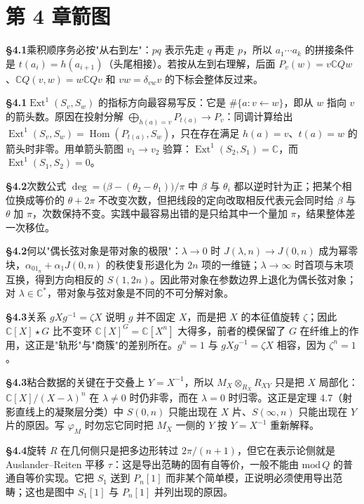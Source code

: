 \section*{第 4 章\quad 箭图}
\noindent\textbf{§4.1}\quad 乘积顺序务必按"从右到左"：$pq$ 表示先走 $q$ 再走 $p$，所以 $a_1\cdots a_k$ 的拼接条件是 $t(a_i)=h(a_{i+1})$（头尾相接）。若按从左到右理解，后面 $P_v(w)=v\mathbb C Qw$、$\mathbb C Q(v,w)=w\mathbb C Qv$ 和 $vw=\delta_{vw}v$ 的下标会整体反过来。\par\medskip
\noindent\textbf{§4.1}\quad $\operatorname{Ext}^1(S_v,S_w)$ 的指标方向最容易写反：它是 $\#\{a:v\leftarrow w\}$，即从 $w$ 指向 $v$ 的箭头数。原因在投射分解 $\bigoplus_{h(a)=v}P_{t(a)}\to P_v$：同调计算给出 $\operatorname{Ext}^1(S_v,S_w)=\operatorname{Hom}(P_{t(a)},S_w)$，只在存在满足 $h(a)=v$、$t(a)=w$ 的箭头时非零。用单箭头箭图 $v_1\to v_2$ 验算：$\operatorname{Ext}^1(S_2,S_1)=\mathbb C$，而 $\operatorname{Ext}^1(S_1,S_2)=0$。\par\medskip
\noindent\textbf{§4.2}\quad 次数公式 $\deg=\bigl(\beta-(\theta_2-\theta_1)\bigr)/\pi$ 中 $\beta$ 与 $\theta_i$ 都以逆时针为正；把某个相位换成等价的 $\theta+2\pi$ 不改变次数，但把线段的定向改取相反代表元会同时给 $\beta$ 与 $\theta$ 加 $\pi$，次数保持不变。实践中最容易出错的是只给其中一个量加 $\pi$，结果整体差一次移位。\par\medskip
\noindent\textbf{§4.2}\quad 何以"偶长弦对象是带对象的极限"：$\lambda\to0$ 时 $J(\lambda,n)\to J(0,n)$ 成为幂零块，$\alpha_01_n+\alpha_1J(0,n)$ 的秩使复形退化为 $2n$ 项的一维链；$\lambda\to\infty$ 时首项与末项互换，得到方向相反的 $S(1,2n)$。因此带对象在参数边界上退化为偶长弦对象；对 $\lambda\in\mathbb C^*$，带对象与弦对象是不同的不可分解对象。\par\medskip
\noindent\textbf{§4.3}\quad 关系 $gXg^{-1}=\zeta X$ 说明 $g$ 并不固定 $X$，而是把 $X$ 的本征值旋转 $\zeta$；因此 $\mathbb C[X]\star G$ 比不变环 $\mathbb C[X]^G=\mathbb C[X^n]$ 大得多，前者的模保留了 $G$ 在纤维上的作用，这正是"轨形"与"商簇"的差别所在。$g^n=1$ 与 $gXg^{-1}=\zeta X$ 相容，因为 $\zeta^n=1$。\par\medskip
\noindent\textbf{§4.3}\quad 粘合数据的关键在于交叠上 $Y=X^{-1}$，所以 $M_X\otimes_{R_X}R_{XY}$ 只是把 $X$ 局部化：$\mathbb C[X]/(X-\lambda)^n$ 在 $\lambda\ne0$ 时仍非零，而在 $\lambda=0$ 时归零。这正是定理 4.7（射影直线上的凝聚层分类）中 $S(0,n)$ 只能出现在 $X$ 片、$S(\infty,n)$ 只能出现在 $Y$ 片的原因。写 $\varphi_M$ 时勿忘它同时把 $M_X$ 一侧的 $Y$ 按 $Y=X^{-1}$ 重新解释。\par\medskip
\noindent\textbf{§4.4}\quad 旋转 $R$ 在几何侧只是把多边形转过 $2\pi/(n+1)$，但它在表示论侧就是 Auslander--Reiten 平移 $\tau$：这是导出范畴的固有自等价，一般不能由 $\mathrm{mod}\,Q$ 的普通自等价实现。它把 $S_1$ 送到 $P_n[1]$ 而非某个简单模，正说明必须使用导出范畴；这也是图中 $S_1[1]$ 与 $P_n[1]$ 并列出现的原因。\par\medskip
